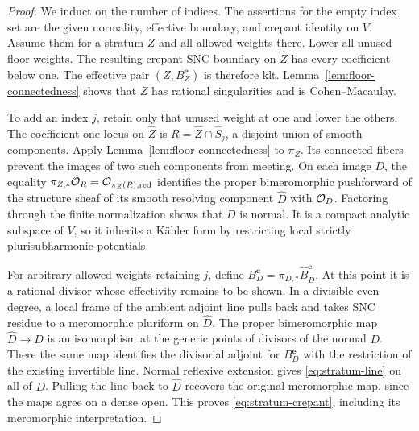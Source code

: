 \begin{proof}
We induct on the number of indices.  The assertions for the empty index
set are the given normality, effective boundary, and crepant identity on
\(V\).  Assume them for a stratum \(Z\) and all allowed weights there.
Lower all unused floor weights.  The resulting crepant SNC boundary on
\(\widehat Z\) has every coefficient below one.  The effective pair
\((Z,B_Z^{\mathbf e})\) is therefore klt.  Lemma~\ref{lem:floor-connectedness}
shows that \(Z\) has rational singularities and is Cohen--Macaulay.

To add an index \(j\), retain only that unused weight at one and lower
the others.  The coefficient-one locus on \(\widehat Z\) is
\(R=\widehat Z\cap\widehat S_j\), a disjoint union of smooth components.
Apply Lemma~\ref{lem:floor-connectedness} to \(\pi_Z\).  Its connected
fibers prevent the images of two such components from meeting.  On each
image \(D\), the equality \(\pi_{Z,*}\mathcal O_R=\mathcal O_{\pi_Z(R),\mathrm{red}}\)
identifies the proper bimeromorphic pushforward of the structure sheaf
of its smooth resolving component \(\widehat D\) with \(\mathcal O_D\).
Factoring through the finite normalization shows that \(D\) is normal.
It is a compact analytic subspace of \(V\), so it inherits a K\"ahler
form by restricting local strictly plurisubharmonic potentials.

For arbitrary allowed weights retaining \(j\), define
\(B_D^{\mathbf e}=\pi_{D,*}\widehat B_{\widehat D}^{\mathbf e}\).
At this point it is a rational divisor whose effectivity remains to be
shown.  In a divisible even degree, a local frame of the ambient adjoint
line pulls back and takes SNC residue to a meromorphic pluriform on
\(\widehat D\).  The proper bimeromorphic map \(\widehat D\to D\) is an
isomorphism at the generic points of divisors of the normal \(D\).
There the same map identifies the divisorial adjoint for
\(B_D^{\mathbf e}\) with the restriction of the existing invertible line.
Normal reflexive extension gives \eqref{eq:stratum-line} on all of \(D\).
Pulling the line back to \(\widehat D\) recovers the original meromorphic
map, since the maps agree on a dense open.  This proves
\eqref{eq:stratum-crepant}, including its meromorphic interpretation.


\end{proof}
